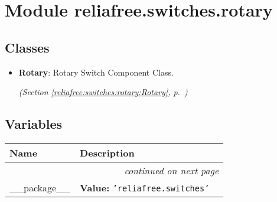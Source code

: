 %
%
%


\section{Module reliafree.switches.rotary}

    \label{reliafree:switches:rotary}


\subsection{Classes}

\begin{itemize}  \setlength{\parskip}{0ex}
  \item \textbf{Rotary}: Rotary Switch Component Class.



  \textit{(Section \ref{reliafree:switches:rotary:Rotary}, p.~\pageref{reliafree:switches:rotary:Rotary})}

\end{itemize}


  \subsection{Variables}

    \vspace{-1cm}
\hspace{\varindent}\begin{longtable}{|p{\varnamewidth}|p{\vardescrwidth}|l}
\cline{1-2}
\cline{1-2} \centering \textbf{Name} & \centering \textbf{Description}& \\
\cline{1-2}
\endhead\cline{1-2}\multicolumn{3}{r}{\small\textit{continued on next page}}\\\endfoot\cline{1-2}
\endlastfoot\raggedright \_\-\_\-p\-a\-c\-k\-a\-g\-e\-\_\-\_\- & \raggedright \textbf{Value:} 
{\tt \texttt{'}\texttt{reliafree.switches}\texttt{'}}&\\
\cline{1-2}
\end{longtable}

